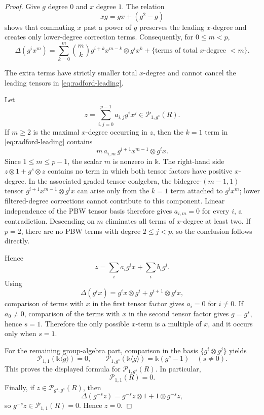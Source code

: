 \documentclass[10pt,a4paper]{amsart}
\newcommand{\K}{\mathds{k}}
\newcommand{\Pp}{\mathcal{P}}
\begin{document}
	\begin{proof}
		Give $g$ degree $0$ and $x$ degree $1$. The relation
		\[
		xg=gx+(g^2-g)
		\]
		shows that commuting $x$ past a power of $g$ preserves the leading
		$x$-degree and creates only lower-degree correction terms. Consequently, for
		$0\le m<p$,
		\begin{equation}\label{eq:radford-leading}
			\Delta(g^ix^m)
			=\sum_{k=0}^{m}\binom{m}{k}
			g^{i+k}x^{m-k}\otimes g^ix^k
			+\{\text{terms of total $x$-degree $<m$}\}.
		\end{equation}
		
		The extra terms have strictly smaller total $x$-degree and cannot cancel
		the leading tensors in \eqref{eq:radford-leading}.
		
		Let
		\[
		z=\sum_{i,j=0}^{p-1}a_{i,j}g^ix^j\in\Pp_{1,g^s}(R).
		\]
		If $m\ge2$ is the maximal $x$-degree occurring in $z$, then the $k=1$ term
		in \eqref{eq:radford-leading} contains
		\[
		m\,a_{i,m}\,g^{i+1}x^{m-1}\otimes g^ix.
		\]
		Since $1\le m\le p-1$, the scalar $m$ is nonzero in $\K$. The right-hand
		side $z\otimes1+g^s\otimes z$ contains no term in which both tensor factors
		have positive $x$-degree. In the associated graded tensor coalgebra, the
		bidegree-$(m-1,1)$ tensor
		$g^{i+1}x^{m-1}\otimes g^ix$ can arise only from the $k=1$ term attached to
		$g^ix^m$; lower filtered-degree corrections cannot contribute to this
		component. Linear independence of the PBW tensor basis therefore gives
		$a_{i,m}=0$ for every $i$, a contradiction. Descending on $m$ eliminates
		all terms of $x$-degree at least two. If $p=2$, there are no
		PBW terms with degree $2\le j<p$, so the conclusion follows directly.
		
		Hence
		\[
		z=\sum_i a_i g^ix+\sum_i b_i g^i.
		\]
		Using
		\[
		\Delta(g^ix)=g^ix\otimes g^i+g^{i+1}\otimes g^ix,
		\]
		comparison of terms with $x$ in the first tensor factor gives $a_i=0$ for
		$i\ne0$. If $a_0\ne0$, comparison of the terms with $x$ in the second tensor
		factor gives $g=g^s$, hence $s=1$. Therefore the only possible $x$-term is a
		multiple of $x$, and it occurs only when $s=1$.
		
		For the remaining group-algebra part, comparison in the basis
		$\{g^i\otimes g^j\}$ yields
		\[
		\Pp_{1,1}(\K\langle g\rangle)=0,
		\qquad
		\Pp_{1,g^s}(\K\langle g\rangle)=\K(g^s-1)
		\quad(s\ne0).
		\]
		This proves the displayed formula for $\Pp_{1,g^s}(R)$. In particular,
		\[
		\Pp_{1,1}(R)=0.
		\]
		Finally, if $z\in\Pp_{g^s,g^s}(R)$, then
		\[
		\Delta(g^{-s}z)=g^{-s}z\otimes1+1\otimes g^{-s}z,
		\]
		so $g^{-s}z\in\Pp_{1,1}(R)=0$. Hence $z=0$.
	\end{proof}
\end{document}
